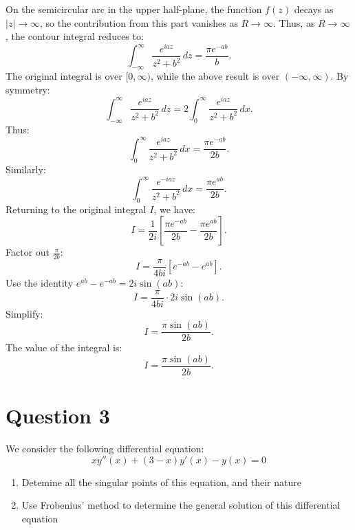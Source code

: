 \documentclass[12pt]{article}
\begin{document}
        On the semicircular arc in the upper half-plane, the function \(f(z)\) decays as \(|z| \to \infty\), so the contribution from this part vanishes as \(R \to \infty\).
        Thus, as \(R \to \infty\), the contour integral reduces to:
        \[
        \int_{-\infty}^\infty \frac{e^{iaz}}{z^2 + b^2} \, dz = \frac{\pi e^{-ab}}{b}.
        \]
        The original integral is over \([0, \infty)\), while the above result is over \((-\infty, \infty)\). By symmetry:
        \[
        \int_{-\infty}^\infty \frac{e^{iaz}}{z^2 + b^2} \, dz = 2 \int_{0}^\infty \frac{e^{iaz}}{z^2 + b^2} \, dx.
        \]
        Thus:
        \[
        \int_{0}^\infty \frac{e^{iaz}}{z^2 + b^2} \, dx = \frac{\pi e^{-ab}}{2b}.
        \]
        Similarly:
        \[
        \int_{0}^\infty \frac{e^{-iaz}}{z^2 + b^2} \, dx = \frac{\pi e^{ab}}{2b}.
        \]
        Returning to the original integral \(I\), we have:
        \[
        I = \frac{1}{2i} \left[\frac{\pi e^{-ab}}{2b} - \frac{\pi e^{ab}}{2b}\right].
        \]
        Factor out \(\frac{\pi}{2b}\):
        \[
        I = \frac{\pi}{4b i} \left[e^{-ab} - e^{ab}\right].
        \]
        Use the identity \(e^{ab} - e^{-ab} = 2i\sin(ab)\):
        \[
        I = \frac{\pi}{4b i} \cdot 2i \sin(ab).
        \]
        Simplify:
        \[
        I = \frac{\pi \sin(ab)}{2b}.
        \]
        The value of the integral is:
        \[
        \boxed{I = \frac{\pi \sin(ab)}{2b}}.
        \]

\section*{Question 3}
    We consider the following differential equation:
    \[
        xy''(x) + (3 - x) y'(x) - y(x) = 0
    \]
    \begin{enumerate}
        \item [a)] Detemine all the singular points of this equation, and their nature
        \item [b)] Use Frobenius' method to determine the general solution of this differential equation
    \end{enumerate}
   
\end{document}
